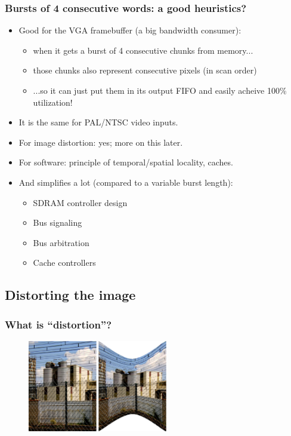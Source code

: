 \documentclass{beamer}
\begin{document}
\frame
{
  \frametitle{Bursts of 4 consecutive words: a good heuristics?}
  
  \begin{itemize}
  \item Good for the VGA framebuffer (a big bandwidth consumer):
  \begin{itemize}
  \item when it gets a burst of 4 consecutive chunks from memory...
  \item those chunks also represent consecutive pixels (in scan order)
  \item ...so it can just put them in its output FIFO and easily acheive 100\% utilization!
  \end{itemize}
  \item It is the same for PAL/NTSC video inputs.
  \item For image distortion: yes; more on this later.
  \item For software: principle of temporal/spatial locality, caches.
  \item And simplifies a lot (compared to a variable burst length):
  \begin{itemize}
  \item SDRAM controller design
  \item Bus signaling
  \item Bus arbitration
  \item Cache controllers
  \end{itemize}
  \end{itemize}
}

\subsection{Distorting the image}
\frame
{
  \begin{center}
  \end{center}
}


\frame
{
  \frametitle{What is ``distortion''?}
  
  \begin{figure}[H]
  \includegraphics[height=40mm]{distortionsanofi.eps}
  \end{figure}
}
\end{document}
